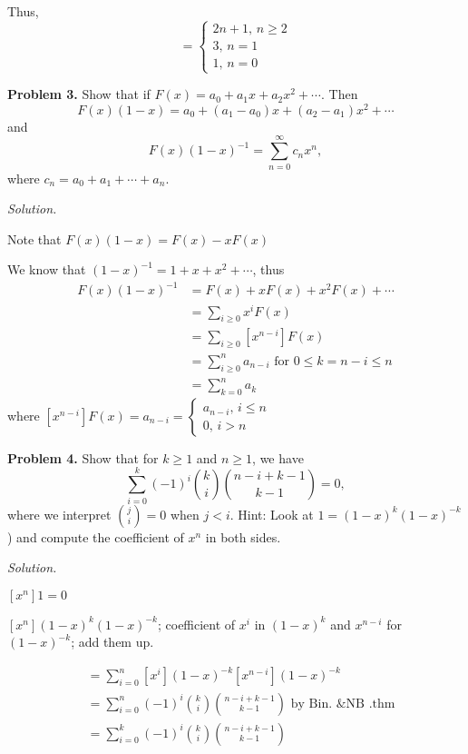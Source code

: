 Thus,
\[ =\begin{cases}
    2n+1,\,n\ge 2\\
    3,\,n=1\\
    1,\,n=0
\end{cases} \]

\textbf{Problem 3.} Show that if $ F(x)=a_0+a_1x+a_2x^2+\cdots $. Then
\[ F(x)(1-x)=a_0+(a_1-a_0)x+(a_2-a_1)x^2+\cdots \]
and
\[ F(x)(1-x)^{-1}=\sum\limits_{n=0}^{\infty} c_n x^n, \]
where $ c_n=a_0+a_1+\cdots+a_n $.

\emph{Solution.}

Note that $ F(x)(1-x)=F(x)-xF(x) $

We know that $ (1-x)^{-1}=1+x+x^2+\cdots $, thus
\begin{align*}
    F(x)(1-x)^{-1}&=
    F(x)+xF(x)+x^2F(x)+\cdots\\
    &=\sum\limits_{i\geq 0}x^{i} F(x)\\
    &=\sum\limits_{i\ge 0}[x^{n-i}] F(x)\\
    &=\sum\limits_{i\ge 0}^{n} a_{n-i} \text{ for } 0\leq k=n-i\leq n\\
    &=\sum\limits_{k=0}^{n} a_k 
\end{align*}
where $ [x^{n-i}]F(x)=a_{n-i}=\begin{cases}
    a_{n-i},\,i\leq n\\
    0,\,i>n
\end{cases} $

\textbf{Problem 4.} Show that for $ k\ge 1 $ and $ n\ge 1 $, we have
\[ \sum\limits_{i=0}^{k} (-1)^i\binom{k}{i}\binom{n-i+k-1}{k-1}=0, \]
where we interpret $ \binom{j}{i}=0 $ when $ j<i $. 
Hint: Look at $ 1=(1-x)^{k}(1-x)^{-k} $) and compute the coefficient of $ x^n $
in both sides.

\emph{Solution.}

$ [x^n]1=0 $

$ [x^n](1-x)^k(1-x)^{-k} $;
coefficient of $ x^i $ in $ (1-x)^k $ and $ x^{n-i} $ for $ (1-x)^{-k} $;
add them up.

\begin{align*}
    &=\sum\limits_{i=0}^{n} [x^i](1-x)^{-k}[x^{n-i}](1-x)^{-k}\\
    &=\sum\limits_{i=0}^{n} (-1)^{i}\binom{k}{i}\binom{n-i+k-1}{k-1}
    \text{ by Bin. \& NB .thm}\\
    &=\sum\limits_{i=0}^{k} (-1)^i\binom{k}{i}\binom{n-i+k-1}{k-1}
\end{align*}
